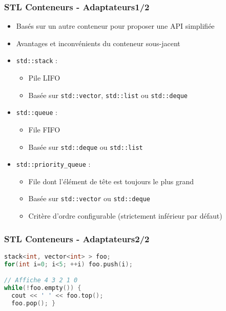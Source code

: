 \documentclass[C++.tex]{subfiles}
\begin{document}
\begin{frame}
	\frametitle{STL Conteneurs - Adaptateurs\titlehfill{}1/2}
	\begin{itemize}
		\item Basés sur un autre conteneur pour proposer une API simplifiée
		\item Avantages et inconvénients du conteneur sous-jacent
		\item \lstinline|std::stack| : 
		\begin{itemize}
			\item Pile LIFO
			\item Basée sur \lstinline|std::vector|, \lstinline|std::list| ou \lstinline|std::deque|
		\end{itemize} 
		\item \lstinline|std::queue| :  
		\begin{itemize}
			\item File FIFO
			\item Basée sur \lstinline|std::deque| ou \lstinline|std::list|
		\end{itemize} 
		\item \lstinline|std::priority_queue| :
		\begin{itemize}
			\item File dont l'élément de tête est toujours le plus grand
			\item Basée sur \lstinline|std::vector| ou \lstinline|std::deque|
			\item Critère d'ordre configurable (strictement inférieur par défaut)
		\end{itemize} 
	\end{itemize}
\end{frame}

\begin{frame}[fragile]
	\frametitle{STL Conteneurs - Adaptateurs\titlehfill{}2/2}
	\begin{lstlisting}[language=C++]
stack<int, vector<int> > foo;
for(int i=0; i<5; ++i) foo.push(i);

// Affiche 4 3 2 1 0
while(!foo.empty()) {
  cout << ' ' << foo.top();
  foo.pop(); }\end{lstlisting}
\end{frame}
\end{document}
